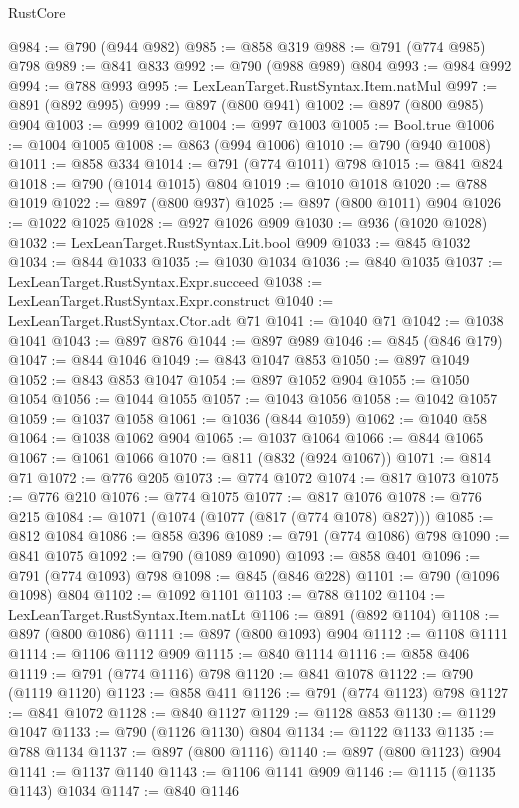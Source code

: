\begin{lexlean}{RustCore}
\begin{coremodule}
@984 := @790 (@944 @982)
@985 := @858 @319
@988 := @791 (@774 @985) @798
@989 := @841 @833
@992 := @790 (@988 @989) @804
@993 := @984 @992
@994 := @788 @993
@995 := LexLeanTarget.RustSyntax.Item.natMul
@997 := @891 (@892 @995)
@999 := @897 (@800 @941)
@1002 := @897 (@800 @985) @904
@1003 := @999 @1002
@1004 := @997 @1003
@1005 := Bool.true
@1006 := @1004 @1005
@1008 := @863 (@994 @1006)
@1010 := @790 (@940 @1008)
@1011 := @858 @334
@1014 := @791 (@774 @1011) @798
@1015 := @841 @824
@1018 := @790 (@1014 @1015) @804
@1019 := @1010 @1018
@1020 := @788 @1019
@1022 := @897 (@800 @937)
@1025 := @897 (@800 @1011) @904
@1026 := @1022 @1025
@1028 := @927 @1026 @909
@1030 := @936 (@1020 @1028)
@1032 := LexLeanTarget.RustSyntax.Lit.bool @909
@1033 := @845 @1032
@1034 := @844 @1033
@1035 := @1030 @1034
@1036 := @840 @1035
@1037 := LexLeanTarget.RustSyntax.Expr.succeed
@1038 := LexLeanTarget.RustSyntax.Expr.construct
@1040 := LexLeanTarget.RustSyntax.Ctor.adt @71
@1041 := @1040 @71
@1042 := @1038 @1041
@1043 := @897 @876
@1044 := @897 @989
@1046 := @845 (@846 @179)
@1047 := @844 @1046
@1049 := @843 @1047 @853
@1050 := @897 @1049
@1052 := @843 @853 @1047
@1054 := @897 @1052 @904
@1055 := @1050 @1054
@1056 := @1044 @1055
@1057 := @1043 @1056
@1058 := @1042 @1057
@1059 := @1037 @1058
@1061 := @1036 (@844 @1059)
@1062 := @1040 @58
@1064 := @1038 @1062 @904
@1065 := @1037 @1064
@1066 := @844 @1065
@1067 := @1061 @1066
@1070 := @811 (@832 (@924 @1067))
@1071 := @814 @71
@1072 := @776 @205
@1073 := @774 @1072
@1074 := @817 @1073
@1075 := @776 @210
@1076 := @774 @1075
@1077 := @817 @1076
@1078 := @776 @215
@1084 := @1071 (@1074 (@1077 (@817 (@774 @1078) @827)))
@1085 := @812 @1084
@1086 := @858 @396
@1089 := @791 (@774 @1086) @798
@1090 := @841 @1075
@1092 := @790 (@1089 @1090)
@1093 := @858 @401
@1096 := @791 (@774 @1093) @798
@1098 := @845 (@846 @228)
@1101 := @790 (@1096 @1098) @804
@1102 := @1092 @1101
@1103 := @788 @1102
@1104 := LexLeanTarget.RustSyntax.Item.natLt
@1106 := @891 (@892 @1104)
@1108 := @897 (@800 @1086)
@1111 := @897 (@800 @1093) @904
@1112 := @1108 @1111
@1114 := @1106 @1112 @909
@1115 := @840 @1114
@1116 := @858 @406
@1119 := @791 (@774 @1116) @798
@1120 := @841 @1078
@1122 := @790 (@1119 @1120)
@1123 := @858 @411
@1126 := @791 (@774 @1123) @798
@1127 := @841 @1072
@1128 := @840 @1127
@1129 := @1128 @853
@1130 := @1129 @1047
@1133 := @790 (@1126 @1130) @804
@1134 := @1122 @1133
@1135 := @788 @1134
@1137 := @897 (@800 @1116)
@1140 := @897 (@800 @1123) @904
@1141 := @1137 @1140
@1143 := @1106 @1141 @909
@1146 := @1115 (@1135 @1143) @1034
@1147 := @840 @1146

\end{coremodule}
\end{lexlean}
